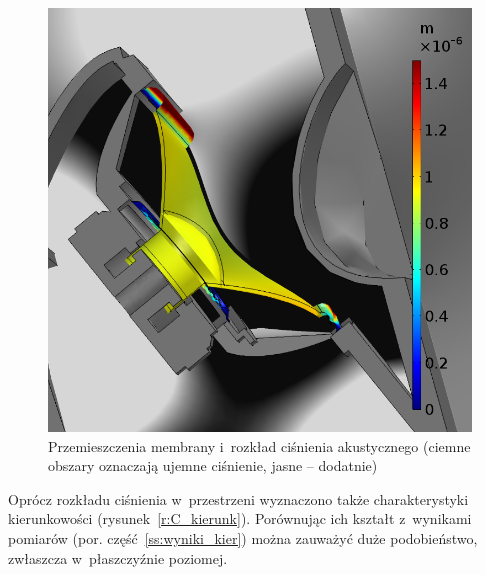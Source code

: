 \documentclass[12pt]{oska}
\begin{document}
	\begin{figure}[!ht]
		\centering
		\includegraphics[width=.55\textwidth]{disp_presure_1kHz.png}
		\caption{Przemieszczenia membrany i~rozkład ciśnienia akustycznego (ciemne obszary oznaczają ujemne ciśnienie, jasne -- dodatnie)}
		\label{r:C_przem_cisn}
	\end{figure}
	
	Oprócz rozkładu ciśnienia w~przestrzeni wyznaczono także charakterystyki kierunkowości (rysunek~\ref{r:C_kierunk}). Porównując ich kształt z~wynikami pomiarów (por. część~\ref{ss:wyniki_kier}) można zauważyć duże podobieństwo, zwłaszcza w~płaszczyźnie poziomej.
	
\end{document}
